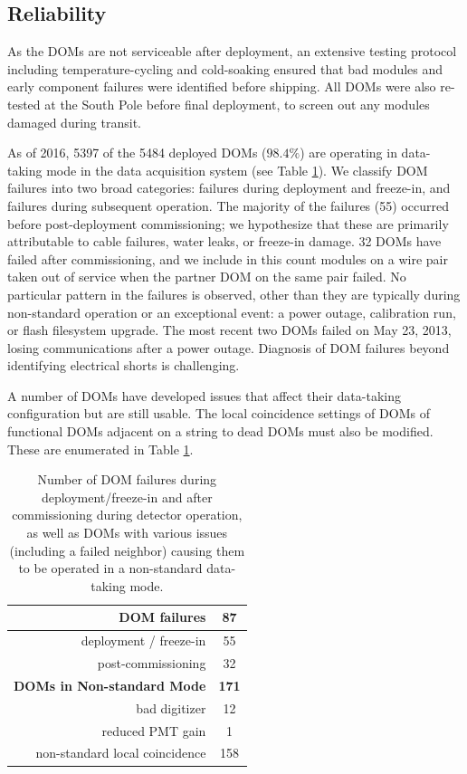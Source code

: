 \subsection{\label{sec:reliability}Reliability}

As the DOMs are not serviceable after deployment, an extensive testing
protocol including temperature-cycling and cold-soaking ensured that bad
modules and early component failures were identified before shipping.
All DOMs were also re-tested at the South Pole before final deployment, to
screen out any modules damaged during transit.

As of 2016, 5397 of the 5484 deployed DOMs ($98.4\%$) are operating in
data-taking mode in the data acquisition system (see Table
\ref{tab:dom_failures}).  We classify DOM 
failures into two broad categories: failures during deployment and
freeze-in, and failures during subsequent operation.  The majority of the
failures (55) occurred before post-deployment commissioning; we hypothesize
that these are primarily attributable to cable failures, water leaks,
or freeze-in damage. 32 DOMs have failed after commissioning, and
we include in this count modules on a wire pair taken out of service when
the partner DOM on the same pair failed.  No particular pattern in the
failures is observed, other than they are typically during non-standard
operation or an exceptional event: a power outage, calibration run, or
flash filesystem upgrade.  The most recent two DOMs failed on May 23, 2013,
losing communications after a power outage.  Diagnosis of DOM failures
beyond identifying electrical shorts is challenging.

A number of DOMs have developed issues that affect their data-taking
configuration but are still usable.  The local coincidence settings of DOMs of
functional DOMs adjacent on a string to dead DOMs must also be
modified. These are enumerated in Table \ref{tab:dom_failures}.  

\begin{table}[h]
  \centering
  \caption{Number of DOM failures during deployment/freeze-in and after
    commissioning during detector operation, as well as DOMs with various
    issues (including a failed neighbor) causing them to be operated in a
    non-standard data-taking mode.} 
  \label{tab:dom_failures}
  \begin{tabular}{| r | c |}
    \hline
    \bf{DOM failures} & \bf{87} \\
    \hline    
    deployment / freeze-in & 55 \\
    post-commissioning & 32 \\
    \hline
    \hline
    \bf{DOMs in Non-standard Mode} & \bf{171} \\
    \hline
    bad digitizer & 12 \\
    reduced PMT gain & 1 \\
    non-standard local coincidence & 158 \\
    \hline    
  \end{tabular}
\end{table}

